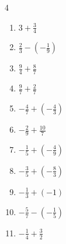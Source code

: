 \begin{multicols}{4}
\begin{enumerate}

\columnbreak %

  \item $\displaystyle 3 + \frac{3}{4}$


  \item $\displaystyle \frac{2}{3} - \left(-\frac{1}{9}\right)$


  \item $\displaystyle \frac{9}{4} + \frac{8}{7}$


  \item $\displaystyle \frac{9}{7} + \frac{2}{7}$


  \item $\displaystyle -\frac{4}{7} + \left(-\frac{4}{3}\right)$


  \item $\displaystyle -\frac{2}{9} + \frac{10}{7}$


  \item $\displaystyle -\frac{1}{5} + \left(-\frac{4}{9}\right)$


  \item $\displaystyle -\frac{3}{5} + \left(-\frac{8}{3}\right)$


  \item $\displaystyle -\frac{1}{3} + \left(-1\right)$


  \item $\displaystyle -\frac{5}{7} - \left(-\frac{1}{5}\right)$


\columnbreak %

  \item $\displaystyle -\frac{1}{4} + \frac{3}{2}$


\end{enumerate}
\end{multicols}

